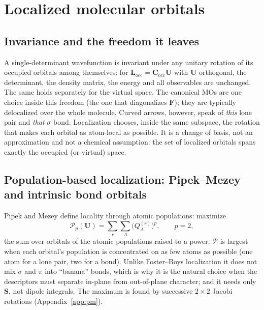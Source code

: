 \documentclass[11pt,a4paper]{article}
\newcommand{\occ}{\mathrm{occ}}
\newcommand{\vb}[1]{\bm{#1}}
\begin{document}
\section{Localized molecular orbitals}
\label{sec:loc}

\subsection{Invariance and the freedom it leaves}
A single-determinant wavefunction is invariant under any unitary rotation of its occupied orbitals among themselves: for $\vb{L}_{\occ}=\vb{C}_{\occ}\vb{U}$ with $\vb{U}$ orthogonal, the determinant, the density matrix, the energy and all observables are unchanged. The same holds separately for the virtual space. The canonical MOs are one choice inside this freedom (the one that diagonalizes $\vb{F}$); they are typically delocalized over the whole molecule. Curved arrows, however, speak of \emph{this} lone pair and \emph{that} $\sigma$ bond. Localization chooses, inside the same subspace, the rotation that makes each orbital as atom-local as possible. It is a change of basis, not an approximation and not a chemical assumption: the set of localized orbitals spans exactly the occupied (or virtual) space.

\subsection{Population-based localization: Pipek--Mezey and intrinsic bond orbitals}
Pipek and Mezey \cite{pm} define locality through atomic populations: maximize
\begin{equation}
\mathcal{P}_p(\vb{U})=\sum_{r}\sum_{A}\big(Q^{(r)}_A\big)^p,\qquad p=2,
\label{eq:pm}
\end{equation}
the sum over orbitals of the atomic populations raised to a power. $\mathcal{P}$ is largest when each orbital's population is concentrated on as few atoms as possible (one atom for a lone pair, two for a bond). Unlike Foster--Boys localization it does not mix $\sigma$ and $\pi$ into ``banana'' bonds, which is why it is the natural choice when the descriptors must separate in-plane from out-of-plane character; and it needs only $\vb{S}$, not dipole integrals. The maximum is found by successive $2\times2$ Jacobi rotations (Appendix~\ref{app:pm}).
\end{document}
